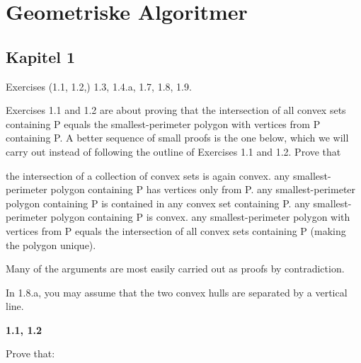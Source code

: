 \chapter{Geometriske Algoritmer}

\section{Kapitel 1}%
\label{sec:99}

Exercises (1.1, 1.2,) 1.3, 1.4.a, 1.7, 1.8, 1.9.

Exercises 1.1 and 1.2 are about proving that the intersection of all convex sets containing P equals the smallest-perimeter polygon with vertices from P containing P. A better sequence of small proofs is the one below, which we will carry out instead of following the outline of Exercises 1.1 and 1.2. Prove that

the intersection of a collection of convex sets is again convex.
any smallest-perimeter polygon containing P has vertices only from P.
any smallest-perimeter polygon containing P is contained in any convex set containing P.
any smallest-perimeter polygon containing P is convex.
any smallest-perimeter polygon with vertices from P equals the intersection of all convex sets containing P (making the polygon unique).

Many of the arguments are most easily carried out as proofs by contradiction.

In 1.8.a, you may assume that the two convex hulls are separated by a vertical line.

\noindent
\textbf{1.1, 1.2}

Prove that:

